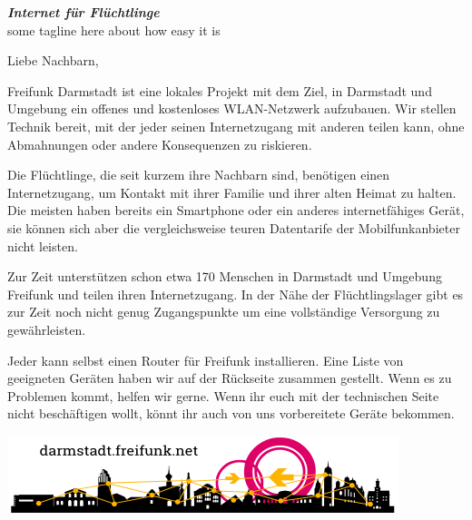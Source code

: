 \documentclass[a4paper]{article}
\begin{document}
\thispagestyle{empty}
 
\begin{center}
\Huge \textit{\textbf{\textcolor{freifunkpink}{Internet für Flüchtlinge}}} \\
\vspace{0.6cm}
\large some tagline here about how easy it is
\normalsize

\vspace{2.5cm}
\end{center}

Liebe Nachbarn,
\vspace{0.5cm}

Freifunk Darmstadt ist eine lokales Projekt mit dem Ziel, in Darmstadt und Umgebung ein offenes und kostenloses WLAN-Netzwerk aufzubauen. Wir stellen Technik bereit, mit der jeder seinen Internetzugang mit anderen teilen kann, ohne Abmahnungen oder andere Konsequenzen zu riskieren.

Die Flüchtlinge, die seit kurzem ihre Nachbarn sind, benötigen einen Internetzugang, um Kontakt mit ihrer Familie und ihrer alten Heimat zu halten. Die meisten haben bereits ein Smartphone oder ein anderes internetfähiges Gerät, sie können sich aber die vergleichsweise teuren Datentarife der Mobilfunkanbieter nicht leisten.

Zur Zeit unterstützen schon etwa 170 Menschen in Darmstadt und Umgebung Freifunk und teilen ihren Internetzugang. In der Nähe der Flüchtlingslager gibt es zur Zeit noch nicht genug Zugangspunkte um eine vollständige Versorgung zu gewährleisten.

Jeder kann selbst einen Router für Freifunk installieren. Eine Liste von geeigneten Geräten haben wir auf der Rückseite zusammen gestellt. Wenn es zu Problemen kommt, helfen wir gerne.
Wenn ihr euch mit der technischen Seite nicht beschäftigen wollt, könnt ihr auch von uns vorbereitete Geräte bekommen.

\vspace{1cm}

\begin{center}
\includegraphics[width=\textwidth]{logo}
\end{center}

\newpage
\end{document}
